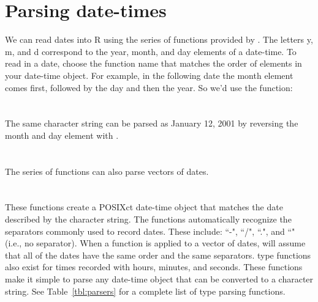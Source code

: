 \documentclass[article]{jss}
\begin{document}





\section{Parsing date-times}
\label{sec:parsing}

We can read dates into R using the  series of functions provided by . The letters y, m, and d correspond to the year, month, and day elements of a date-time. To read in a date, choose the function name that matches the order of elements in your date-time object. For example, in the following date the month element comes first, followed by the day and then the year. So we'd use the  function:\\

\\
\\

The same character string can be parsed as January 12, 2001 by reversing the month and day element with .\\

\\
\\

The  series of functions can also parse vectors of dates.\\

\\
\\


These functions create a POSIXct date-time object that matches the date described by the character string.  The functions automatically recognize the separators commonly used to record dates. These include: ``-", ``/", ``.", and ``" (i.e., no separator).  When a  function is applied to a vector of dates,  will assume that all of the dates have the same order and the same separators.  type functions also exist for times recorded with hours, minutes, and seconds. These functions make it simple to parse any date-time object that can be converted to a character string. See Table~\ref{tbl:parsers} for a complete list of  type parsing functions. 
\end{document}
